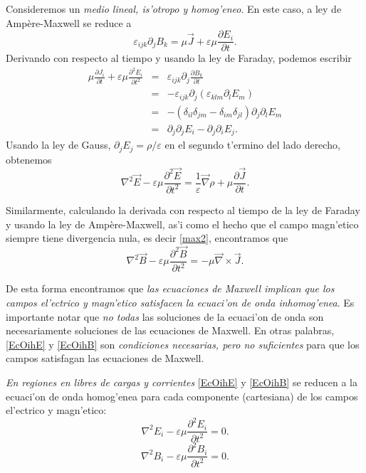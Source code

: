 Consideremos un \textit{medio lineal, is'otropo y homog'eneo}. En este caso, a ley de Amp\`ere-Maxwell se reduce a
\begin{equation}
\varepsilon_{ijk}\partial_jB_k=\mu\vec{J}+\varepsilon\mu\frac{\partial E_i}{\partial t}.
\end{equation}
Derivando con respecto al tiempo y usando la ley de Faraday, podemos escribir
\begin{eqnarray}
\mu \frac{\partial J_i}{\partial t}+\varepsilon\mu\frac{\partial^2E_i}{\partial t^2}
&=&\varepsilon_{ijk}\partial_j\frac {\partial B_k}{\partial t} \\
&=&-\varepsilon_{ijk}\partial_j\left(\varepsilon_{klm}\partial_lE_m \right)\\
&=&-\left( \delta_{il}\delta_{jm}-\delta_{im}\delta_{jl}\right)
\partial_j\partial_lE_m\\
&=&\partial_j\partial_jE_i-\partial_j\partial_iE_j.
\end{eqnarray}
Usando la ley de Gauss, $\partial_jE_j=\rho/\varepsilon$ en el segundo t'ermino del lado derecho, obtenemos
\begin{equation}\label{EcOihE}
\boxed{\nabla^2\vec{E}-\varepsilon\mu\frac{\partial^2\vec{E}}{\partial t^2}=\frac{1}{\varepsilon}\vec\nabla\rho+\mu\frac{\partial\vec{J}}{\partial t}.}
\end{equation}

Similarmente, calculando la derivada con respecto al tiempo de la ley de Faraday y usando la ley de Amp\`ere-Maxwell, as'i como el hecho que el campo magn'etico siempre tiene divergencia nula, es decir \eqref{max2}, encontramos que
\begin{equation}\label{EcOihB}
\boxed{\nabla^2\vec{B}-\varepsilon\mu\frac{\partial^2\vec{B}}{\partial t^2}=-\mu\vec\nabla\times\vec{J}.}
\end{equation}

De esta forma encontramos que \textit{las ecuaciones de Maxwell implican que los
campos el'ectrico y magn'etico satisfacen la ecuaci'on de onda inhomog'enea}. Es importante notar que \textit{no todas} las soluciones de la ecuaci'on de onda son necesariamente soluciones de las ecuaciones de Maxwell. En otras palabras, \eqref{EcOihE} y \eqref{EcOihB} son \textit{condiciones necesarias, pero no suficientes} para que los campos satisfagan las ecuaciones de Maxwell.

\textit{En regiones en libres de cargas y corrientes} \eqref{EcOihE} y \eqref{EcOihB} se reducen a la ecuaci'on de onda homog'enea para cada componente (cartesiana) de los campos el'ectrico y magn'etico:
\begin{equation}\label{econdaE}
\boxed{\nabla^2E_i-\varepsilon\mu\frac{\partial^2E_i}{\partial t^2}=0.}
\end{equation}
\begin{equation}
\boxed{\nabla^2B_i-\varepsilon\mu\frac{\partial^2B_i}{\partial t^2}=0.}
\label{econdaB}
\end{equation}



